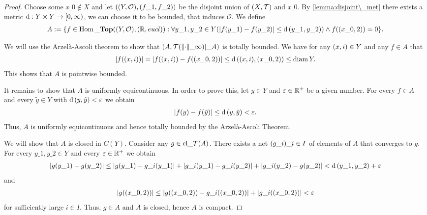 \begin{proof}
	Choose some $x\_0 \notin X$ and let $\pbraces{\tspace[Y][O], (f\_1, f\_2)}$ be the disjoint union of $\tspace$ and $x\_0$. By \ref{lemma:disjoint\_met} there exists a metric $\metric: Y \times Y \to [0, \infty)$, we can choose it to be bounded, that induces $\mathcal{O}$. We define
	\begin{align*}
		A := \Bbraces{f \in \Hom\_\Top\pbraces{\tspace[Y][O], \pbraces{\R, \eucl}} : \forall y\_1, y\_2 \in Y\pbraces{\vbraces{f(y\_1) - f(y\_2)} \leq \metric\pbraces{y\_1, y\_2}} \land f\pbraces{\pbraces{x\_0, 2}} = 0}.
	\end{align*}
	
	We will use the Arzelà-Ascoli theorem \cite[p. 458]{Ana1&2} to show that $\pbraces{A, \mathcal{T}\pbraces{\norm[\infty]{\cdot}}\vert\_A}$ is totally bounded. We have for any $\pbraces{x,i} \in Y$ and any $f \in A$ that
	\begin{align*}
		\vbraces{f\pbraces{(x,i)}} = \vbraces{f\pbraces{(x,i)} - f\pbraces{\pbraces{x\_0, 2}}} \leq \metric\pbraces{(x,i), \pbraces{x\_0, 2}} \leq \diam Y.
	\end{align*}
	This shows that $A$ is pointwise bounded.
	
	It remains to show that $A$ is uniformly equicontinuous. In order to prove this, let $y \in Y$ and $\varepsilon \in \R^+$ be a given number. For every $f \in A$ and every $\tilde{y} \in Y$ with $\metric\pbraces{y, \tilde{y}} < \varepsilon$ we obtain
	\begin{align*}
		\vbraces{f(y) - f\pbraces{\tilde{y}}} \leq \metric\pbraces{y, \tilde{y}} < \varepsilon.
	\end{align*}
	Thus, $A$ is uniformly equicontinuous and hence totally bounded by the Arzelà-Ascoli Theorem.
	
	We will show that $A$ is closed in $C(Y)$. Consider any $g \in \cl{A}$. There exists a net $\pbraces{g\_i}\_{i \in I}$ of elements of $A$ that converges to $g$. For every $y\_1, y\_2 \in Y$ and every $\varepsilon \in \R^+$ we obtain
	\begin{align*}
		\vbraces{g\pbraces{y\_1} - g\pbraces{y\_2}} \leq \vbraces{g\pbraces{y\_1} - g\_i\pbraces{y\_1}} + \vbraces{g\_i\pbraces{y\_1} - g\_i\pbraces{y\_2}} + \vbraces{g\_i\pbraces{y\_2} - g\pbraces{y\_2}} < \metric\pbraces{y\_1, y\_2} + \varepsilon
	\end{align*} 
	and 
	\begin{align*}
		\vbraces{g\pbraces{\pbraces{x\_0, 2}}} \leq \vbraces{g\pbraces{\pbraces{x\_0, 2}} - g\_i\pbraces{\pbraces{x\_0, 2}}} + \vbraces{g\_i\pbraces{\pbraces{x\_0, 2}}} < \varepsilon
	\end{align*}
	for sufficiently large $i \in I$. Thus, $g \in A$ and $A$ is closed, hence $A$ is compact. 
	

\end{proof}
